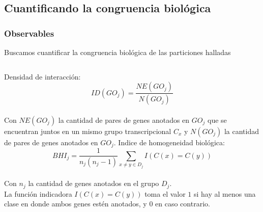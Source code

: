 \documentclass[serif,9pt, t]{beamer}
\begin{document}
\subsection{Cuantificando la congruencia biológica}
\begin{frame}\frametitle{Observables} 
\centering
Buscamos cuantificar la congruencia biológica de las particiones halladas
\bigskip
\begin{columns}[T]
Densidad de interacción:\\
\bigskip
\begin{equation}
ID(GO_j) = \frac{NE(GO_j)}{N(GO_j)}
\end{equation}\\
\bigskip
Con $NE(GO_j)$ la cantidad de pares de genes anotados en $GO_j$ que se encuentran juntos en un mismo grupo transcripcional $C_x$ y $N(GO_j)$ la cantidad de pares de genes anotados en $GO_j$.
Indice de homogeneidad biológica:\\
\bigskip
\begin{equation*}
BHI_j = \frac{1}{n_j(n_j-1)}\sum\limits_{x\neq y\in D_j}I(C(x)=C(y))
\end{equation*}\\
\medskip	
Con $n_j$ la cantidad de genes anotados en el grupo $D_j$.\\
La función indicadora $I(C(x)=C(y))$ toma el valor $1$ si hay al menos una clase en donde ambos genes estén anotados, y $0$ en caso contrario.
\end{columns}
\end{frame}
\end{document}
